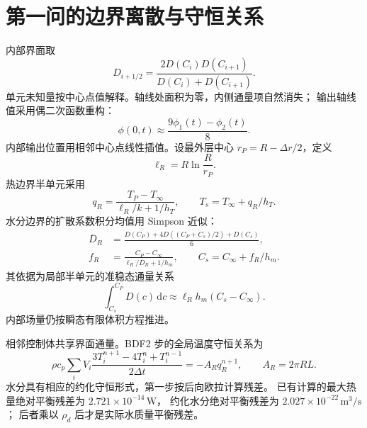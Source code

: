 \section{第一问的边界离散与守恒关系}
\label{app:q1-numerics}
内部界面取
\begin{equation}
D_{i+1/2}=\frac{2D(C_i)D(C_{i+1})}{D(C_i)+D(C_{i+1})}.
\end{equation}
单元未知量按中心点值解释。轴线处面积为零，内侧通量项自然消失；
输出轴线值采用偶二次函数重构：
\begin{equation}
\phi(0,t)\approx\frac{9\phi_1(t)-\phi_2(t)}8.
\end{equation}
内部输出位置用相邻中心点线性插值。设最外层中心 $r_P=R-\Delta r/2$，定义
\begin{equation}
\ell_R=R\ln\frac{R}{r_P}.
\end{equation}
热边界半单元采用
\begin{equation}
q_R=\frac{T_P-T_\infty}{\ell_R/k+1/h_T},\qquad
T_s=T_\infty+q_R/h_T.
\end{equation}
水分边界的扩散系数积分均值用 Simpson 近似：
\begin{align}
\overline D_R&=\frac{D(C_P)+4D((C_P+C_s)/2)+D(C_s)}6,\\
f_R&=\frac{C_P-C_\infty}{\ell_R/\overline D_R+1/h_m},\qquad
C_s=C_\infty+f_R/h_m.
\end{align}
其依据为局部半单元的准稳态通量关系
\begin{equation}
\int_{C_s}^{C_P}D(c)\,\mathrm dc\approx\ell_Rh_m(C_s-C_\infty).
\end{equation}
内部场量仍按瞬态有限体积方程推进。

相邻控制体共享界面通量。BDF2 步的全局温度守恒关系为
\begin{equation}
\rho c_p\sum_iV_i\frac{3T_i^{n+1}-4T_i^n+T_i^{n-1}}{2\Delta t}
=-A_Rq_R^{n+1},\qquad A_R=2\pi RL.
\end{equation}
水分具有相应的约化守恒形式，第一步按后向欧拉计算残差。
已有计算的最大热量绝对平衡残差为 $2.721\times10^{-14}\,\mathrm W$，
约化水分绝对平衡残差为 $2.027\times10^{-22}\,\mathrm{m^3/s}$；
后者乘以 $\rho_d$ 后才是实际水质量平衡残差。
